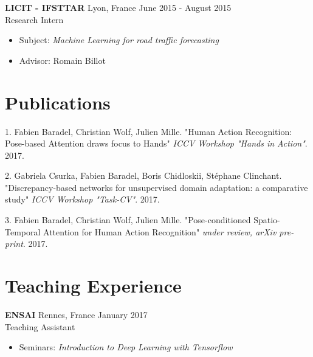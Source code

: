\documentclass[10pt]{res} %
\begin{document}
\begin{resume}
\textbf{LICIT - IFSTTAR} \hfill Lyon, France \hfill June 2015 - August 2015 \\
Research Intern
\begin{itemize}
\item Subject: \textit{Machine Learning for road traffic forecasting}
\item Advisor: Romain Billot
\end{itemize}



\section{\large Publications} 
1. Fabien Baradel, Christian Wolf, Julien Mille. "Human Action Recognition: Pose-based Attention draws focus to Hands" \textit{ICCV Workshop "Hands in Action"}. 2017.

2. Gabriela Csurka, Fabien Baradel, Boris Chidloskii, Stéphane Clinchant. "Discrepancy-based networks for unsupervised domain adaptation: a comparative study" \textit{ICCV Workshop "Task-CV"}. 2017.

3. Fabien Baradel, Christian Wolf, Julien Mille. "Pose-conditioned Spatio-Temporal Attention for Human Action Recognition" \textit{under review, arXiv pre-print}. 2017.





\section{\large Teaching Experience} 
\textbf{ENSAI} \hfill Rennes, France \hfill January 2017 \\
Teaching Assistant
\begin{itemize}
\item Seminars: \textit{Introduction to Deep Learning with Tensorflow}
\end{itemize}


\end{resume}
\end{document}

